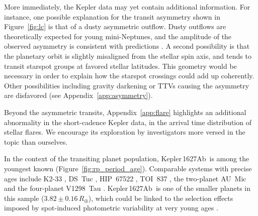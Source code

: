 \documentclass[12pt,modern,twocolumn,tighten,linenumbers]{aastex63}
\newcommand{\pn}{Kepler\,1627Ab} %
\begin{document}
More immediately, the Kepler data may yet contain additional
information.  For instance, one possible explanation for the transit
asymmetry shown in Figure~\ref{fig:lc} is that of a dusty asymmetric
outflow.  
Dusty outflows are theoretically
expected for young mini-Neptunes, and the amplitude of the observed
asymmetry is consistent with predictions \citep{wang_dai_2019}.
A second possibility is that the planetary orbit is slightly
misaligned from the stellar spin axis, and tends to transit starspot
groups at favored stellar latitudes.  
This geometry would be necessary in order to
explain how the starspot crossings could add up coherently.
Other possibilities including
gravity darkening or TTVs causing the asymmetry are disfavored (see
Appendix~\ref{app:asymmetry}).  

Beyond the asymmetric transits, Appendix~\ref{app:flare}
highlights an additional abnormality in the short-cadence Kepler data, in the
arrival time distribution of stellar flares.  We encourage its
exploration by investigators more versed in the topic than ourselves.

In the context of the transiting planet population, \pn\ is among the
youngest known (Figure~\ref{fig:rp_period_age}).  Comparable systems
with precise ages include K2-33
\citep{Mann_K2_33b_2016,David_et_al_2017}, DS~Tuc
\citep{benatti_possibly_2019,newton_tess_2019}, HIP~67522
\citep{rizzuto_tess_2020}, TOI~837 \citep{bouma_cluster_2020}, the
two-planet AU~Mic \citep{plavchan_planet_2020,martioli_aumicbc_2021}
and the four-planet V1298~Tau \citep{david_four_2019}.  \pn\ is one of
the smaller planets in this sample ($3.82\pm0.16\,R_\oplus$), which
could be linked to the selection effects imposed by spot-induced
photometric variability at very young ages \citep[{\it
e.g.},][]{zhou_2021_tois}. 
\end{document}
